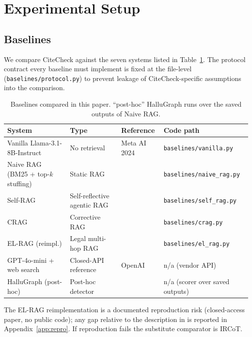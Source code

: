 \documentclass[11pt]{article}
\begin{document}
\section{Experimental Setup}
\label{sec:setup}

\subsection{Baselines}
\label{sec:setup:baselines}

We compare CiteCheck against the seven systems listed in
Table~\ref{tab:baselines}. The protocol contract every baseline must
implement is fixed at the file-level (\texttt{baselines/protocol.py})
to prevent leakage of CiteCheck-specific assumptions into the
comparison.

\begin{table}[t]
\centering
\small
\begin{tabular}{llll}
\toprule
\textbf{System} & \textbf{Type} & \textbf{Reference}
                & \textbf{Code path} \\
\midrule
Vanilla Llama-3.1-8B-Instruct & No retrieval
   & Meta AI 2024
   & \texttt{baselines/vanilla.py} \\
Naive RAG (BM25 + top-$k$ stuffing) & Static RAG
   & \citet{lewis2020rag}
   & \texttt{baselines/naive\_rag.py} \\
Self-RAG & Self-reflective agentic RAG
   & \citet{asai2023selfrag}
   & \texttt{baselines/self\_rag.py} \\
CRAG & Corrective RAG
   & \citet{yan2024crag}
   & \texttt{baselines/crag.py} \\
EL-RAG (reimpl.) & Legal multi-hop RAG
   & \citet{wankhade2026elrag}
   & \texttt{baselines/el\_rag.py} \\
GPT-4o-mini + web search & Closed-API reference
   & OpenAI
   & n/a (vendor API) \\
HalluGraph (post-hoc) & Post-hoc detector
   & \citet{noel2025hallugraph}
   & n/a (scorer over saved outputs) \\
\bottomrule
\end{tabular}
\caption{Baselines compared in this paper.
``post-hoc'' HalluGraph runs over the saved outputs of Naive RAG.}
\label{tab:baselines}
\end{table}

The EL-RAG reimplementation is a documented reproduction risk
(closed-access paper, no public code); any gap relative to the
description in \citet{wankhade2026elrag} is reported in
Appendix~\ref{app:repro}. If reproduction fails the substitute
comparator is IRCoT.
\end{document}
